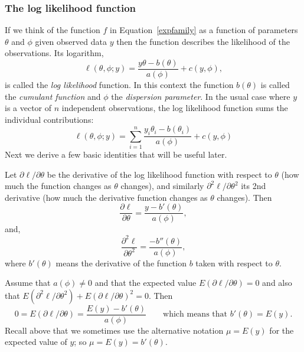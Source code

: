 \documentclass[10pt]{article} %
\begin{document}
\subsubsection*{The log likelihood function}
If we think of the function $f$ in Equation~\ref{expfamily} as
a function of parameters $\theta$ and $\phi$ given observed data $y$ then
the function describes the likelihood of the observations. Its logarithm,
\begin{equation*}
\ell(\theta, \phi; y) = \frac{y\theta - b(\theta)}{a(\phi)} + c(y, \phi),
\end{equation*}
is called the \emph{log likelihood} function.  In this context the
function $b(\theta)$ is called the \emph{cumulant function} and $\phi$
the \emph{dispersion parameter}.
In the usual case where $y$ is a vector
of $n$ independent observations, the log likelihood function
sums the individual contributions:
\begin{equation}\label{loglik}
\ell(\theta, \phi; y) = \sum_{i=1}^n\frac{y_i\theta_i - b(\theta_i)}{a(\phi)} + c(y, \phi)
\end{equation}
Next we derive a few basic identities that
will be useful later.

Let $\partial\ell/\partial\theta$ be the derivative of the log likelihood
function with respect to $\theta$ (how much the function changes as
$\theta$ changes), and similarly $\partial^2\ell/\partial\theta^2$
its 2nd derivative (how much the derivative function changes as
$\theta$ changes). Then
\begin{equation}\label{dl}
\frac{\partial\ell}{\partial\theta} = \frac{y - b'(\theta)}{a(\phi)},
\end{equation}
and,
\begin{equation}\label{d2l}
\frac{\partial^2\ell}{\partial\theta^2} = \frac{-b''(\theta)}{a(\phi)},
\end{equation}
where $b'(\theta)$ means the derivative of the function $b$ taken with
respect to $\theta$.

Assume that $a(\phi)\ne 0$ and that 
the expected value $E(\partial\ell/\partial\theta) = 0$
and also that
$E(\partial^2\ell/\partial\theta^2) + E(\partial\ell/\partial\theta)^2 = 0$.
Then
\begin{equation}\label{bprime}
0 = E(\partial\ell/\partial\theta)  = \frac{E(y) - b'(\theta)}{a(\phi)}
\qquad\mbox{which means that}\,\,b'(\theta) = E(y).
\end{equation}
Recall above that we sometimes use the alternative notation $\mu=E(y)$
for the expected value of $y$; so $\mu=E(y)=b'(\theta)$.
\end{document}
